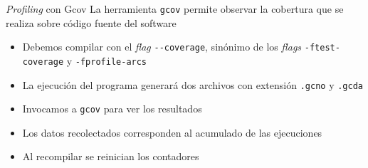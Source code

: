 \begin{frame}[fragile]{\emph{Profiling} con Gcov}
    La herramienta \verb|gcov| permite observar la cobertura que se realiza sobre código fuente del software
    \begin{itemize}
        \item Debemos compilar con el \emph{flag} \verb|--coverage|, sinónimo de los \emph{flags} \verb|-ftest-coverage| y \verb|-fprofile-arcs|
        \item La ejecución del programa generará dos archivos con extensión \verb|.gcno| y \verb|.gcda|
        \item Invocamos a \verb|gcov| para ver los resultados
        \item Los datos recolectados corresponden al acumulado de las ejecuciones
        \item Al recompilar se reinician los contadores
    \end{itemize}
\end{frame}

